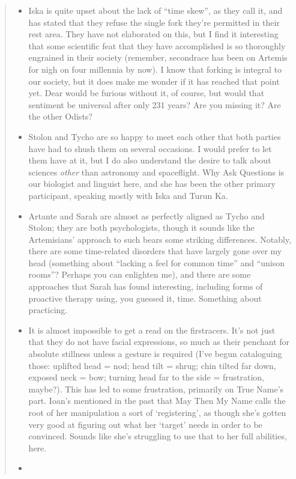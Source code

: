 \begin{quote}
\begin{itemize}
\tightlist
\item
  Iska is quite upset about the lack of ``time skew'', as they call it, and has stated that they refuse the single fork they're permitted in their rest area. They have not elaborated on this, but I find it interesting that some scientific feat that they have accomplished is so thoroughly engrained in their society (remember, secondrace has been on Artemis for nigh on four millennia by now). I know that forking is integral to our society, but it does make me wonder if it has reached that point yet. Dear would be furious without it, of course, but would that sentiment be universal after only 231 years? Are you missing it? Are the other Odists?
\item
  Stolon and Tycho are so happy to meet each other that both parties have had to shush them on several occasions. I would prefer to let them have at it, but I do also understand the desire to talk about sciences \emph{other} than astronomy and spaceflight. Why Ask Questions is our biologist and linguist here, and she has been the other primary participant, speaking mostly with Iska and Turun Ka.
\item
  Artante and Sarah are almost as perfectly aligned as Tycho and Stolon; they are both psychologists, though it sounds like the Artemisians' approach to such bears some striking differences. Notably, there are some time-related disorders that have largely gone over my head (something about ``lacking a feel for common time'' and ``unison rooms''? Perhaps you can enlighten me), and there are some approaches that Sarah has found interesting, including forms of proactive therapy using, you guessed it, time. Something about practicing.
\item
  It is almost impossible to get a read on the firstracers. It's not just that they do not have facial expressions, so much as their penchant for absolute stillness unless a gesture is required (I've begun cataloguing those: uplifted head = nod; head tilt = shrug; chin tilted far down, exposed neck = bow; turning head far to the side = frustration, maybe?). This has led to some frustration, primarily on True Name's part. Ioan's mentioned in the past that May Then My Name calls the root of her manipulation a sort of `registering', as though she's gotten very good at figuring out what her `target' needs in order to be convinced. Sounds like she's struggling to use that to her full abilities, here.
\item

\end{itemize}
\end{quote}
